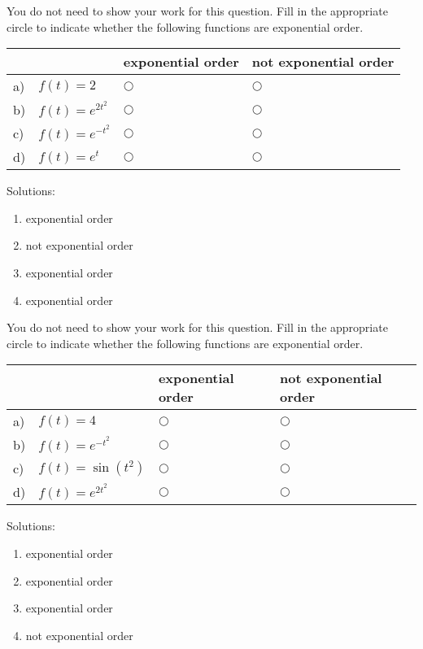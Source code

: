 \ifnum {}
\question[2] You do not need to show your work for this question. Fill in the appropriate circle to indicate whether the following functions are exponential order. 
\vspace{-0.2cm}
\setlength{\extrarowheight}{0.20cm}
\begin{center}
\hspace{-.9cm}\begin{tabular}{ p{0.20cm} p{4cm} p{3.5cm} p{4cm} }
    & & exponential order &  not exponential order  \\[2pt] \hline 
    a) & $f(t) = 2$ & $\bigcirc$  & $\bigcirc$ \\[8pt]  
    b) & $f(t) = e^{2t^2}$  & $\bigcirc$  & $\bigcirc$ \\[8pt] 
    c) & $f(t) = e^{-t^2}$  & $\bigcirc$  & $\bigcirc$ \\[8pt] 
    d) & $f(t) = e^{t}$  & $\bigcirc$  & $\bigcirc$ \\[8pt] 
    \hline
\end{tabular}
\end{center}
\setlength{\extrarowheight}{0.0cm}
\ifnum {} {\color{DarkBlue} Solutions: 
\begin{enumerate}[label=(\alph*)]
    \item exponential order
    \item not exponential order
    \item exponential order
    \item exponential order
\end{enumerate}
}
\fi
\vspace{-6pt} 
\fi 

\ifnum {}
\question[2] You do not need to show your work for this question. Fill in the appropriate circle to indicate whether the following functions are exponential order. 
\vspace{-0.2cm}
\setlength{\extrarowheight}{0.20cm}
\begin{center}
\hspace{-.9cm}\begin{tabular}{ p{0.20cm} p{4cm} p{3.5cm} p{4cm} }
    & & exponential order &  not exponential order  \\[2pt] \hline 
    a) & $f(t) = 4$ & $\bigcirc$  & $\bigcirc$ \\[8pt]  
    b) & $f(t) = e^{-t^2}$  & $\bigcirc$  & $\bigcirc$ \\[8pt] 
    c) & $f(t) = \sin(t^2)$  & $\bigcirc$  & $\bigcirc$ \\[8pt] 
    d) & $f(t) = e^{2t^2}$  & $\bigcirc$  & $\bigcirc$ \\[8pt] 
    \hline
\end{tabular}
\end{center}
\setlength{\extrarowheight}{0.0cm}
\ifnum {} {\color{DarkBlue} Solutions: 
\begin{enumerate}[label=(\alph*)]
    \item exponential order
    \item exponential order
    \item exponential order
    \item not exponential order
\end{enumerate}
}
\fi
\vspace{-6pt} 
\fi 